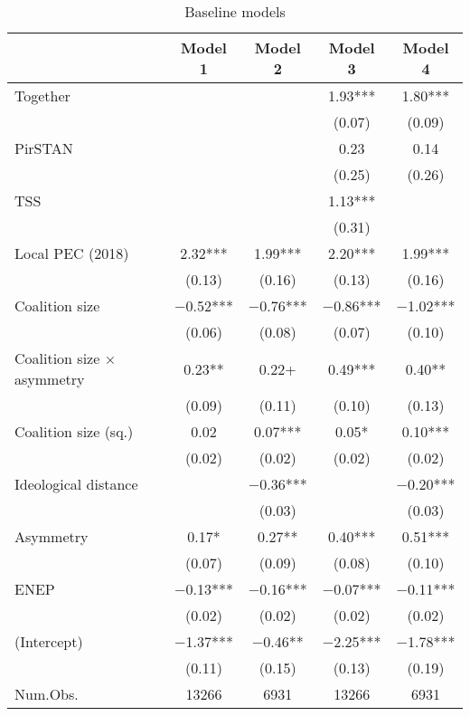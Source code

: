 \begin{table}

\caption{Baseline models}
\centering
\begin{tabular}[t]{lcccc}
\toprule
  & Model 1 & Model 2 & Model 3 & Model 4\\
\midrule
Together &  &  & \num{1.93}*** & \num{1.80}***\\
 &  &  & (\num{0.07}) & (\num{0.09})\\
PirSTAN &  &  & \num{0.23} & \num{0.14}\\
 &  &  & (\num{0.25}) & (\num{0.26})\\
TSS &  &  & \num{1.13}*** & \\
 &  &  & (\num{0.31}) & \\
Local PEC (2018) & \num{2.32}*** & \num{1.99}*** & \num{2.20}*** & \num{1.99}***\\
 & (\num{0.13}) & (\num{0.16}) & (\num{0.13}) & (\num{0.16})\\
Coalition size & \num{-0.52}*** & \num{-0.76}*** & \num{-0.86}*** & \num{-1.02}***\\
 & (\num{0.06}) & (\num{0.08}) & (\num{0.07}) & (\num{0.10})\\
Coalition size × asymmetry & \num{0.23}** & \num{0.22}+ & \num{0.49}*** & \num{0.40}**\\
 & (\num{0.09}) & (\num{0.11}) & (\num{0.10}) & (\num{0.13})\\
Coalition size (sq.) & \num{0.02} & \num{0.07}*** & \num{0.05}* & \num{0.10}***\\
 & (\num{0.02}) & (\num{0.02}) & (\num{0.02}) & \vphantom{1} (\num{0.02})\\
Ideological distance &  & \num{-0.36}*** &  & \num{-0.20}***\\
 &  & (\num{0.03}) &  & (\num{0.03})\\
Asymmetry & \num{0.17}* & \num{0.27}** & \num{0.40}*** & \num{0.51}***\\
 & (\num{0.07}) & (\num{0.09}) & (\num{0.08}) & (\num{0.10})\\
ENEP & \num{-0.13}*** & \num{-0.16}*** & \num{-0.07}*** & \num{-0.11}***\\
 & (\num{0.02}) & (\num{0.02}) & (\num{0.02}) & (\num{0.02})\\
(Intercept) & \num{-1.37}*** & \num{-0.46}** & \num{-2.25}*** & \num{-1.78}***\\
 & (\num{0.11}) & (\num{0.15}) & (\num{0.13}) & (\num{0.19})\\
\midrule
Num.Obs. & \num{13266} & \num{6931} & \num{13266} & \num{6931}\\

\end{tabular}
\end{table}
